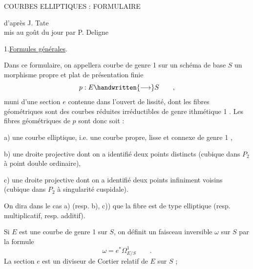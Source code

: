 
\begin{center}
COURBES ELLIPTIQUES : FORMULAIRE

d'après J. Tate\\
mis au goût du jour par P. Deligne
\end{center}

1.\qquad \uline{Formules générales}.

Dans ce formulaire, on appellera courbe de genre 1 sur un schéma de base $S$ un morphisme propre et plat de présentation finie
\[
p : E \handwritten{\longrightarrow} S \qquad ,
\]
muni d'une section $e$ contenue dans l'ouvert de lissité, dont les fibres géométriques sont des courbes réduites irréductibles de genre ithmétique 1 . Les fibres géométriques de $p$ sont donc soit :

a) une courbe elliptique, i.e. une courbe propre, lisse et connexe de genre 1 ,

b) une droite projective dont on a identifié deux points distincts (cubique dans $P_2$ à point double ordinaire),

c) une droite projective dont on a identifié deux points infiniment voisins (cubique dans $P_2$ à singularité cuspidale).

On dira dans le cas a) (resp. b), c)) que la fibre est de type elliptique (resp. multiplicatif, resp. additif).

Si $E$ est une courbe de genre 1 sur $S$, on définit un faisceau inversible $\omega$ sur $S$ par la formule
\[
\omega=e^*\Omega^1_{E/S}\qquad .
\]
La section $e$ est un diviseur de Cortier relatif de $E$ sur $S$ ;

